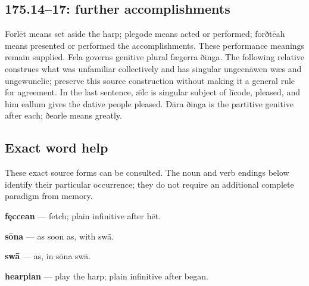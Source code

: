 \subsection*{175.14–17: further accomplishments}

Forlēt means set aside the harp; plegode means acted or performed; forðtēah means presented or performed the accomplishments. These performance meanings remain supplied. Fela governs genitive plural fægerra ðinga. The following relative construes what was unfamiliar collectively and has singular ungecnāwen wæs and ungewunelic; preserve this source construction without making it a general rule for agreement. In the last sentence, ǣlc is singular subject of līcode, pleased, and him eallum gives the dative people pleased. Ðāra ðinga is the partitive genitive after each; ðearle means greatly.

\subsection*{Exact word help}

These exact source forms can be consulted. The noun and verb endings below identify their particular occurrence; they do not require an additional complete paradigm from memory.

\textbf{fęccean} — fetch; plain infinitive after hēt.

\textbf{sōna} — as soon as, with swā.

\textbf{swā} — as, in sōna swā.

\textbf{hearpian} — play the harp; plain infinitive after began.

